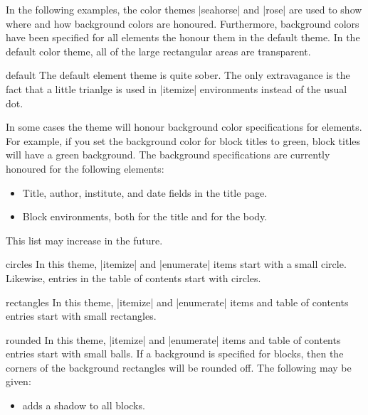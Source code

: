 In the following examples, the color themes |seahorse| and |rose| are
used to show where and how background colors are
honoured. Furthermore, background colors have been specified for all
elements the honour them in the default theme. In the default color
theme, all of the large rectangular areas are transparent.

\begin{innerthemeexample}{default}
  The default element theme is quite sober. The only extravagance is
  the fact that a little trianlge is used in |itemize| environments
  instead of the usual dot.

  In some cases the theme will honour background color specifications
  for elements. For example, if you set the background color for block
  titles to green, block titles will have a green background. The
  background specifications are currently honoured for the following
  elements: 
  \begin{itemize}
  \item Title, author, institute, and date fields in the title
    page.
  \item Block environments, both for the title and for the body.
  \end{itemize}
  This list may increase in the future.
\end{innerthemeexample}

\begin{innerthemeexample}{circles}
  In this theme, |itemize| and |enumerate| items start with a small
  circle. Likewise, entries in the table of contents start with
  circles. 
\end{innerthemeexample}

\begin{innerthemeexample}{rectangles}
  In this theme, |itemize| and |enumerate| items and table of contents
  entries  start with small rectangles. 
\end{innerthemeexample}

\begin{innerthemeexample}{rounded}
  In this theme, |itemize| and |enumerate| items and table of contents
  entries start with small balls. If a background is specified for
  blocks, then the corners of the background rectangles will be
  rounded off. The following  may be given:

  \begin{itemize}
  \item {} adds a shadow to all blocks.
  \end{itemize}
\end{innerthemeexample}




